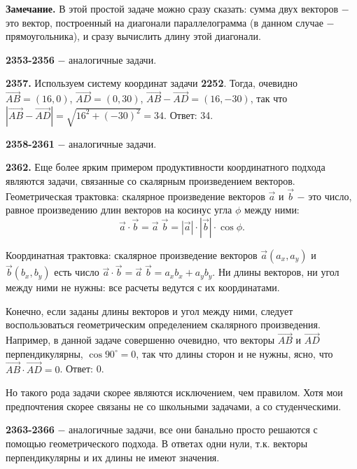 \textbf{Замечание.} В этой простой задаче можно сразу сказать: сумма двух векторов $-$ это вектор, построенный на  диагонали параллелограмма (в данном случае $-$ прямоугольника), и сразу вычислить длину этой диагонали. 

\textbf{2353-2356} $-$ аналогичные задачи.

\textbf{2357.}  Используем систему координат задачи \textbf{2252}. Тогда, очевидно
$\overrightarrow{AB}=(16, 0)$, $\overrightarrow{AD} = (0, 30)$, $\overrightarrow{AB} - \overrightarrow{AD} = (16, -30)$, так что $|\overrightarrow{AB} - \overrightarrow{AD}|=\sqrt{16^2+(-30)^2}=34$. \newline \null \hspace*{\fill} Ответ: 34.

\textbf{2358-2361} $-$ аналогичные задачи.

\textbf{2362.} Еще более ярким примером продуктивности координатного подхода являются задачи, связанные со скалярным произведением векторов. Геометрическая трактовка: скалярное произведение векторов $\overrightarrow{a}$ и $\overrightarrow{b}$ $-$ это число, равное произведению длин векторов на косинус угла $\phi$ между ними:
\[
\vec{a}\cdot \vec{b}=\vec{a}\;
\vec{b}=|\vec{a}|\cdot|\vec{b}|\cdot\cos{\phi}.\]

Координатная трактовка: скалярное произведение векторов \linebreak $\vec{a}(a_x, a_y)$ и $\vec{b}(b_x, b_y)$ есть число $\vec{a}\cdot \vec{b}=\vec{a}\;
\vec{b} = a_xb_x+a_yb_y$. Ни длины векторов, ни угол между ними не нужны: все расчеты ведутся с их координатами.

Конечно, если заданы длины векторов и угол между ними, следует воспользоваться геометрическим определением скалярного произведения. Например, в данной задаче совершенно очевидно, что векторы $\overrightarrow{AB}$ и $\overrightarrow{AD}$ перпендикулярны, $\cos{90^\circ}=0$, так что длины сторон и не нужны, ясно, что $\overrightarrow{AB}\cdot\overrightarrow{AD}=0$. \newline \null \hspace*{\fill} Ответ: 0.                       

Но такого рода задачи скорее являются исключением, чем правилом. Хотя мои предпочтения скорее связаны не со школьными задачами, а со студенческими.

\textbf{2363-2366} $-$ аналогичные задачи, все они банально просто решаются с помощью геометрического подхода. В ответах одни нули, т.к. векторы перпендикулярны и их длины не имеют значения.

